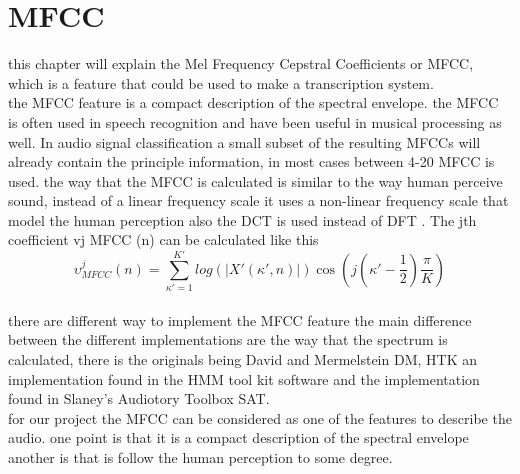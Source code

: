 \section{MFCC}
this chapter will explain the Mel Frequency Cepstral Coefficients or MFCC, which is a feature that could be used to make a transcription system. \\
the MFCC feature is a compact description of the spectral envelope. the MFCC is often used in speech recognition and have been useful in musical processing as well\citep{ACA}. In audio signal classification a small subset of the resulting MFCCs will already contain the principle information, in most cases between 4-20 MFCC is used. the way that the MFCC is calculated is  similar to the way human perceive sound, instead of a linear frequency scale it uses a non-linear frequency scale that model the human perception also the DCT is used instead of DFT \citep{ACA}. The jth coefficient 
vj  MFCC (n) can be calculated like this\citep{ACA}\\
\begin{equation}\label{ eq:MFCC calculation}
	 \upsilon ^j  _{MFCC} (n) = \sum_{\kappa'=1}^{K'} log(\vert X' (\kappa',n) \vert)\cos(j(\kappa' - \frac{1}{2})\frac{\pi}{K})
\end{equation}
\\
there are different way to implement the MFCC feature the main difference between the different implementations are the way that the spectrum is calculated, there is the originals being David and Mermelstein DM, HTK an implementation found in the HMM tool kit software and the implementation found in Slaney's Audiotory Toolbox SAT\citep{ACA}.
\\
for our project the MFCC can be considered as one of the features to describe the audio. one point is that it is a compact description of the spectral envelope another is that is follow the human perception to some degree.